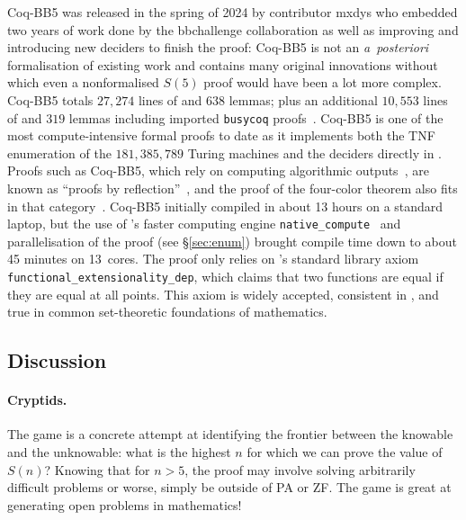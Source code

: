 \documentclass[sigconf,screen]{acmart}
\theoremstyle{definition} %
\numberwithin{equation}{section}
\theoremstyle{definition} %
\newcommand{\BBtheFifthTNF}{181{,}385{,}789}
\newcommand{\CoqBB}{Coq-BB5\xspace}
\begin{document}
\CoqBB was released in the spring of 2024 by contributor mxdys who embedded two years of work done by the bbchallenge collaboration as well as improving and introducing new deciders to finish the proof: \CoqBB is not an \textit{a~posteriori} formalisation of existing work and contains many original innovations without which even a nonformalised $S(5)$ proof would have been a lot more complex. \CoqBB totals $27{,}274$ lines of \Coq and $638$ lemmas; plus an additional $10{,}553$ lines of \Coq and $319$ lemmas including imported \texttt{busycoq} proofs~\cite{busycoq}. \CoqBB is one of the most compute-intensive formal proofs to date as it implements both the TNF enumeration of the $\BBtheFifthTNF$ Turing machines and the deciders directly in \Coq. Proofs such as \CoqBB, which rely on computing algorithmic outputs~\cite{vmcompute,nativecompute}, are known as ``proofs by reflection''~\cite{boutin1997using}, and the \Coq proof of the four-color theorem also fits in that category~\cite{gonthier2008formal,gonthier2023computer,gonthier2010introduction}.  \CoqBB initially compiled in about 13 hours on a standard laptop, but the use of \Coq's faster computing engine \texttt{native\_compute}~\cite{nativecompute} and parallelisation of the proof (see \S\ref{sec:enum}) brought compile time down to about 45 minutes on 13~cores. The proof only relies on \Coq's standard library axiom \texttt{functional\_extensionality\_dep}, which claims that two functions are equal if they are equal at all points. This axiom is widely accepted, consistent in \Coq, and true in common set-theoretic foundations of mathematics.

\subsection{Discussion}\label{sec:intro:discuss}

\paragraph{Cryptids.} The \BBfull game is a concrete attempt at identifying the frontier between the knowable and the unknowable: what is the highest $n$ for which we can prove the value of $S(n)$? Knowing that for $n > 5$, the proof may involve solving arbitrarily difficult problems or worse, simply be outside of PA or ZF. The \BBfull game is great at generating open problems in mathematics!
\end{document}

